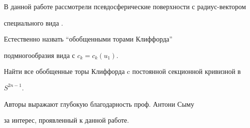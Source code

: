 В данной работе рассмотрели псевдосферические поверхности с радиус-вектором


специального вида .


Естественно назвать ``обобщенными торами Клиффорда''


подмногообразия вида  с $c_k = c_k (u_1)$. 





\begin{probl}


Найти все обобщенные торы Клиффорда c постоянной секционной кривизной в


$S^{2n-1}$.


\end{probl}





Авторы выражают глубокую благодарность проф. Антони Сыму


за интерес, проявленный к данной работе.








